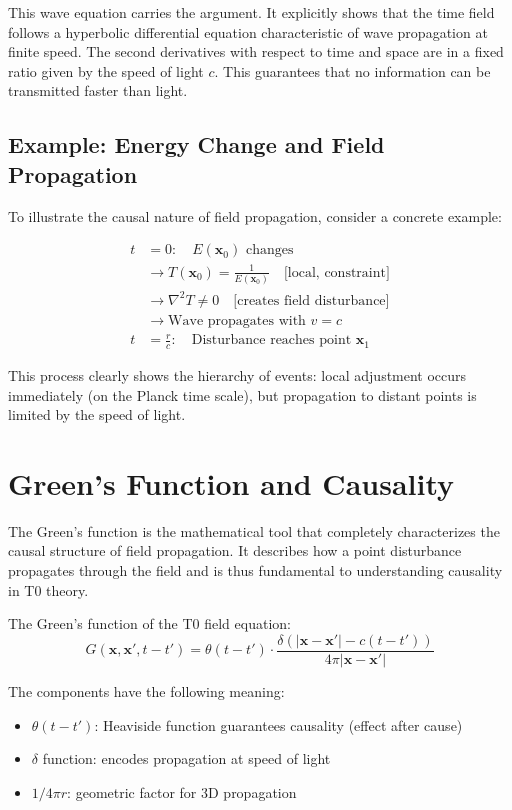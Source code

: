 	This wave equation carries the argument. It explicitly shows that the time field follows a hyperbolic differential equation characteristic of wave propagation at finite speed. The second derivatives with respect to time and space are in a fixed ratio given by the speed of light $c$. This guarantees that no information can be transmitted faster than light.
	
	\subsection{Example: Energy Change and Field Propagation}
	
	To illustrate the causal nature of field propagation, consider a concrete example:
	
	\begin{align}
		t &= 0: \quad E(\mathbf{x}_0) \text{ changes} \\
		&\rightarrow T(\mathbf{x}_0) = \frac{1}{E(\mathbf{x}_0)} \quad \text{[local, constraint]} \\
		&\rightarrow \nabla^2 T \neq 0 \quad \text{[creates field disturbance]} \\
		&\rightarrow \text{Wave propagates with } v = c \\
		t &= \frac{r}{c}: \quad \text{Disturbance reaches point } \mathbf{x}_1
	\end{align}
	
	This process clearly shows the hierarchy of events: local adjustment occurs immediately (on the Planck time scale), but propagation to distant points is limited by the speed of light.
	
	\section{Green's Function and Causality}
	
	The Green's function is the mathematical tool that completely characterizes the causal structure of field propagation. It describes how a point disturbance propagates through the field and is thus fundamental to understanding causality in T0 theory.
	
	The Green's function of the T0 field equation:
	\begin{equation}
		G(\mathbf{x},\mathbf{x}',t-t') = \theta(t-t') \cdot \frac{\delta(|\mathbf{x}-\mathbf{x}'| - c(t-t'))}{4\pi|\mathbf{x}-\mathbf{x}'|} \label{eq:green}
	\end{equation}
	
	The components have the following meaning:
	\begin{itemize}
		\item $\theta(t-t')$: Heaviside function guarantees causality (effect after cause)
		\item $\delta$ function: encodes propagation at speed of light
		\item $1/4\pi r$: geometric factor for 3D propagation
	\end{itemize}
	
